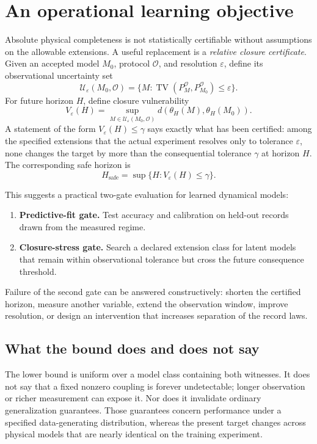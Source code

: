 \documentclass[10pt]{article}
\newcommand{\TV}{\operatorname{TV}}
\begin{document}
\newpage

\section{An operational learning objective}

Absolute physical completeness is not statistically certifiable without assumptions on the allowable extensions. A useful replacement is a \emph{relative closure certificate}. Given an accepted model $M_0$, protocol $\mathcal O$, and resolution $\varepsilon$, define its observational uncertainty set
\[
\mathcal U_\varepsilon(M_0,\mathcal O)
=\{M:\TV(P_M^{\mathcal O},P_{M_0}^{\mathcal O})\leq\varepsilon\}.
\]
For future horizon $H$, define closure vulnerability
\[
V_\varepsilon(H)
=\sup_{M\in\mathcal U_\varepsilon(M_0,\mathcal O)}
d(\theta_H(M),\theta_H(M_0)).
\]
A statement of the form $V_\varepsilon(H)\leq\gamma$ says exactly what has been certified: among the specified extensions that the actual experiment resolves only to tolerance $\varepsilon$, none changes the target by more than the consequential tolerance $\gamma$ at horizon $H$. The corresponding safe horizon is
\[
H_{\mathrm{safe}}
=\sup\{H:V_\varepsilon(H)\leq\gamma\}.
\]

This suggests a practical two-gate evaluation for learned dynamical models:
\begin{enumerate}
\item \textbf{Predictive-fit gate.} Test accuracy and calibration on held-out records drawn from the measured regime.
\item \textbf{Closure-stress gate.} Search a declared extension class for latent models that remain within observational tolerance but cross the future consequence threshold.
\end{enumerate}
Failure of the second gate can be answered constructively: shorten the certified horizon, measure another variable, extend the observation window, improve resolution, or design an intervention that increases separation of the record laws.

\subsection{What the bound does and does not say}

The lower bound is uniform over a model class containing both witnesses. It does not say that a fixed nonzero coupling is forever undetectable; longer observation or richer measurement can expose it. Nor does it invalidate ordinary generalization guarantees. Those guarantees concern performance under a specified data-generating distribution, whereas the present target changes across physical models that are nearly identical on the training experiment.
\end{document}
